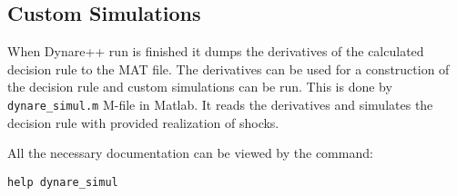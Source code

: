 \documentclass[10pt]{article}
\begin{document}
\subsection{Custom Simulations}
\label{custom}

When Dynare++ run is finished it dumps the derivatives of the
calculated decision rule to the MAT file. The derivatives can be used
for a construction of the decision rule and custom simulations can be
run. This is done by {\tt dynare\_simul.m} M-file in Matlab. It reads
the derivatives and simulates the decision rule with provided
realization of shocks.

All the necessary documentation can be viewed by the command:
{\small
\begin{verbatim}
help dynare_simul
\end{verbatim}
}
\end{document}
